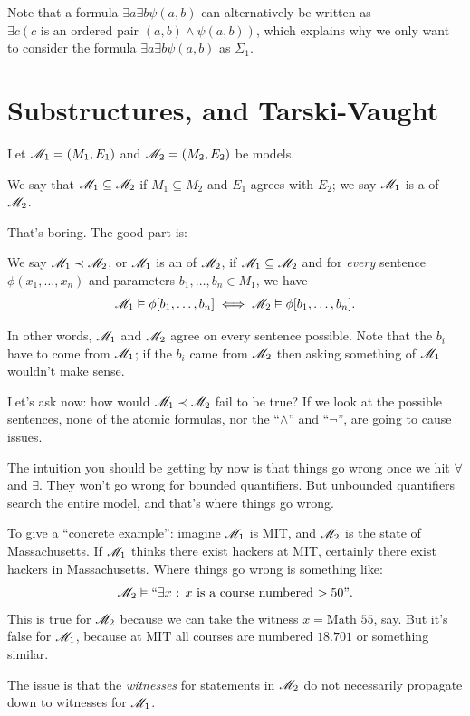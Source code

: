 \begin{remark}
	Note that a formula $\exists a \exists b \psi(a, b)$ can alternatively be written as $\exists c
	(\text{$c$ is an ordered pair $(a, b)$} \land \psi(a, b))$, which explains why we only
	want to consider the formula $\exists a \exists b \psi(a, b)$ as $\Sigma_1$.
\end{remark}

\section{Substructures, and Tarski-Vaught}
Let $\mathscr M_1 = (M_1, E_1)$ and $\mathscr M_2 = (M_2, E_2)$ be models.
\begin{definition}
	We say that $\mathscr M_1 \subseteq \mathscr M_2$ if $M_1 \subseteq M_2$ and
	$E_1$ agrees with $E_2$; we say $\mathscr M_1$ is a  of $\mathscr M_2$.
\end{definition}

That's boring. The good part is:
\begin{definition}
	We say $\mathscr M_1 \prec \mathscr M_2$, or $\mathscr M_1$ is an  of $\mathscr M_2$,
	if $\mathscr M_1 \subseteq \mathscr M_2$ and for \emph{every} sentence $\phi(x_1, \dots, x_n)$
	and parameters $b_1, \dots, b_n \in M_1$, we have
	\[
		\mathscr M_1 \vDash \phi[b_1, \dots, b_n] \iff
		\mathscr M_2 \vDash \phi[b_1, \dots, b_n].
	\]
\end{definition}
In other words, $\mathscr M_1$ and $\mathscr M_2$ agree on every sentence possible.
Note that the $b_i$ have to come from $\mathscr M_1$; if the $b_i$ came from $\mathscr M_2$ then
asking something of $\mathscr M_1$ wouldn't make sense.

Let's ask now: how would $\mathscr M_1 \prec \mathscr M_2$ fail to be true?
If we look at the possible sentences, none of the atomic formulas,
nor the ``$\land$'' and ``$\neg$'', are going to cause issues.

The intuition you should be getting by now is that things go
wrong once we hit $\forall$ and $\exists$.
They won't go wrong for bounded quantifiers.
But unbounded quantifiers search the entire model, and that's where things go wrong.

To give a ``concrete example'':
imagine $\mathscr M_1$ is MIT, and $\mathscr M_2$ is the state of Massachusetts.
If $\mathscr M_1$ thinks there exist hackers at MIT,
certainly there exist hackers in Massachusetts.
Where things go wrong is something like:
\[ \mathscr M_2 \vDash \text{``$\exists x$ : $x$ is a course numbered $> 50$''}. \]
This is true for $\mathscr M_2$ because we can
take the witness $x = \text{Math 55}$, say.
But it's false for $\mathscr M_1$,
because at MIT all courses are numbered $18.701$ or something similar.
\begin{moral}
	The issue is that the \emph{witnesses}
	for statements in $\mathscr M_2$ do not necessarily propagate
	down to witnesses for $\mathscr M_1$.
\end{moral}

